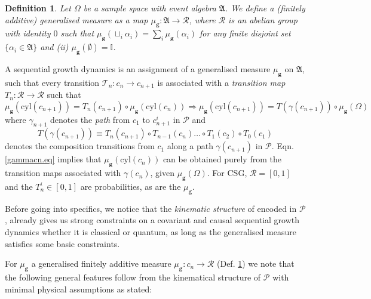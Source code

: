 \documentclass[11pt]{article}
\newtheorem*{definition}{Definition}
\newcommand{\cyl}[1]{{\mathrm{cyl}({#1})}}
\newcommand{\cP}{\mathcal P}
\newcommand{\cT}{\mathcal T}
\newcommand{\cR}{\mathcal R}
\newcommand{\rt}{\rightarrow}
\newcommand{\fA}{\mathfrak A}
\newcommand{\gmu}{\mu_{\mathbf{g}}}
\newcommand{\id}{\mathbb I}
\begin{document}
\begin{definition} \label{gmu.def} 
Let $\Omega$ be a sample space with event algebra $\fA$.   We define a
(finitely additive) 
{\sl  generalised measure}  as a map $\gmu: \fA \rightarrow
\cR$, where $\cR$ is an abelian group  with
identity $0$ such that $\gmu(\sqcup_i\alpha_i) = \sum_i \gmu(\alpha_i) $ for any finite
disjoint set $\{ \alpha_i \in \fA\}$ and (ii)
$\gmu(\emptyset)=\id$. 
\end{definition} 


 A sequential growth dynamics is an assignment of a generalised
 measure $\gmu$ on $\fA$,  such that every transition $\cT_n: c_n
 \rightarrow c_{n+1}$ is associated with a
 {\sl transition  map}  $T_n: \cR \rightarrow \cR$ such that 
 \begin{equation}
\gmu(\cyl{c_{n+1}}) = T_n(c_{n+1}) \circ \gmu(\cyl{c_n}) \Rightarrow
\gmu(\cyl{c_{n+1}}) = T(\gamma(c_{n+1})) \circ
\gmu(\Omega) \label{gammacn.eq} 
  \end{equation}
  where $\gamma_{n+1}$ denotes the {\sl path}  from $c_1$ to
  $c_{n+1}^i$ in $\cP$ and
  \begin{equation} T(\gamma(c_{n+1})) \equiv T_n(c_{n+1})
    \circ T_{n-1}(c_{n}) \ldots \circ T_1(c_{2}) \circ T_0(c_1) \end{equation}
  denotes the composition 
  transitions from $c_1$ along a path $\gamma(c_{n+1})$ in $\cP$. 
Eqn. \eqref{gammacn.eq} implies that 
  $\gmu(\cyl{c_n})$ can be obtained purely from the
  transition maps associated with  $\gamma(c_n)$, given
  $\gmu(\Omega)$. 
For CSG,  $\cR = [0,1]$ and the $T_n^i \in [0,1]$  are probabilities, 
as are the $\gmu$. 
  
Before going into specifics, we notice that the  
{\it kinematic structure} of encoded in  $\cP$, already gives us
strong constraints on a covariant and causal sequential growth
dynamics whether it is classical or quantum, as long as the
generalised measure satisfies some basic constraints. 


For $\gmu$ a  generalised finitely additive measure  $\gmu: c_n \rt
\cR$ (Def. \ref{gmu.def}) we note that the following general
features follow from the kinematical structure of $\cP$ with minimal
physical assumptions as stated:  
\end{document}
